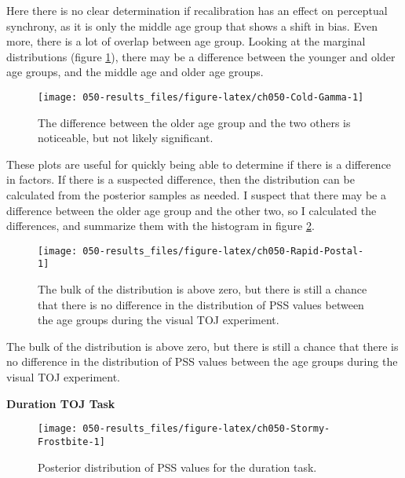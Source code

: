 \documentclass[11pt, oneside, openany]{scrbook}
\begin{document}
Here there is no clear determination if recalibration has an effect on perceptual synchrony, as it is only the middle age group that shows a shift in bias. Even more, there is a lot of overlap between age group. Looking at the marginal distributions (figure \ref{fig:ch050-Cold-Gamma}), there may be a difference between the younger and older age groups, and the middle age and older age groups.

\begin{figure}

{\centering \texttt{[image: 050-results\_files/figure-latex/ch050-Cold-Gamma-1]} 

}

\caption{The difference between the older age group and the two others is noticeable, but not likely significant.}\label{fig:ch050-Cold-Gamma}
\end{figure}

These plots are useful for quickly being able to determine if there is a difference in factors. If there is a suspected difference, then the distribution can be calculated from the posterior samples as needed. I suspect that there may be a difference between the older age group and the other two, so I calculated the differences, and summarize them with the histogram in figure \ref{fig:ch050-Rapid-Postal}.

\begin{figure}

{\centering \texttt{[image: 050-results\_files/figure-latex/ch050-Rapid-Postal-1]} 

}

\caption{The bulk of the distribution is above zero, but there is still a chance that there is no difference in the distribution of PSS values between the age groups during the visual TOJ experiment.}\label{fig:ch050-Rapid-Postal}
\end{figure}

The bulk of the distribution is above zero, but there is still a chance that there is no difference in the distribution of PSS values between the age groups during the visual TOJ experiment.

\textbf{Duration TOJ Task}

\begin{figure}

{\centering \texttt{[image: 050-results\_files/figure-latex/ch050-Stormy-Frostbite-1]} 

}

\caption{Posterior distribution of PSS values for the duration task.}\label{fig:ch050-Stormy-Frostbite}
\end{figure}
\end{document}
